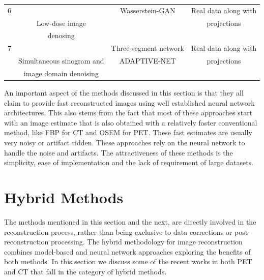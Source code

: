 \begin{table}[ht!]
\begin{tabular}{||c|c|c|c||}
		\hline
		6         & \cite{yang2018low}        &    Wasserstein-GAN & Real data along with            \\ 
		          & Low-dose image            &                    & projections                     \\ 
		          & denosing                  &                    &                                 \\ 
		\hline
		7         & \cite{zhu2020low}         &  Three-segment network  & Real data along with            \\ 
		          & Simultaneous sinogram and &  ADAPTIVE-NET      & projections                     \\ 
	 	          & image domain denoising    &                    &                                 \\ 
		\hline
		
	\end{tabular}
	
\end{table}

An important aspect of the methods discussed in this section is that they all claim to provide fast reconstructed images using well established neural network architectures. This also stems from the fact that most of these approaches start with an image estimate that is also obtained with a relatively faster conventional method, like \ac{FBP} for \ac{CT} and \ac{OSEM} for \ac{PET}. These fast estimates are usually very noisy or artifact ridden. These approaches rely on the neural network to handle the noise and artifacts. The attractiveness of these methods is the simplicity, ease of implementation and the lack of requirement of large datasets. 

\section{Hybrid Methods}

The methods mentioned in this section and the next, are directly involved in the reconstruction process, rather than being exclusive to data corrections or post-reconstruction processing. The hybrid methodology for image reconstruction combines model-based and neural network approaches exploring the benefits of both methods. In this section we discuss some of the recent works in both \ac{PET} and \ac{CT} that fall in the category of hybrid methods.


